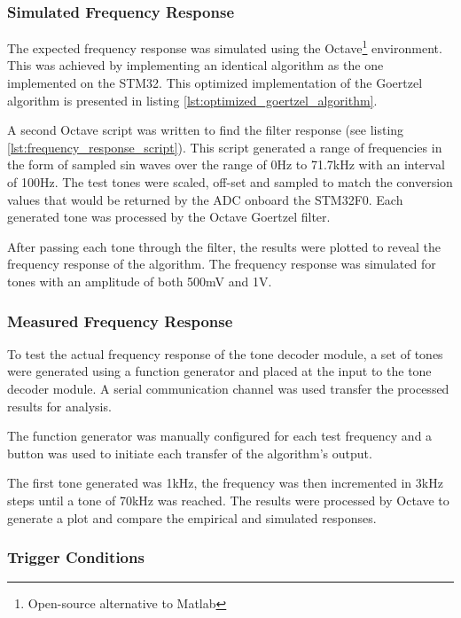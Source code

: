 \subsubsection{Simulated Frequency Response}
The expected frequency response was simulated using the Octave\footnote{Open-source alternative to Matlab} environment. This was achieved by implementing an identical algorithm as the one implemented on the STM32. This optimized implementation of the Goertzel algorithm is presented in listing \ref{lst:optimized_goertzel_algorithm}.

A second Octave script was written to find the filter response (see listing \ref{lst:frequency_response_script}). This script generated a range of frequencies in the form of sampled sin waves over the range of 0Hz to 71.7kHz with an interval of 100Hz. The test tones were scaled, off-set and sampled to match the conversion values that would be returned by the ADC onboard the STM32F0. Each generated tone was processed by the Octave Goertzel filter.

After passing each tone through the filter, the results were plotted to reveal the frequency response of the algorithm. The frequency response was simulated for tones with an amplitude of both 500mV and 1V.

\subsubsection{Measured Frequency Response}

To test the actual frequency response of the tone decoder module, a set of tones were generated using a function generator and placed at the input to the tone decoder module. A serial communication channel was used transfer the processed results for analysis.

The function generator was manually configured for each test frequency and a button was used to initiate each transfer of the algorithm's output.

The first tone generated was 1kHz, the frequency was then incremented in 3kHz steps until a tone of 70kHz was reached. The results were processed by Octave to generate a plot and compare the empirical and simulated responses.


\subsubsection{Trigger Conditions}

